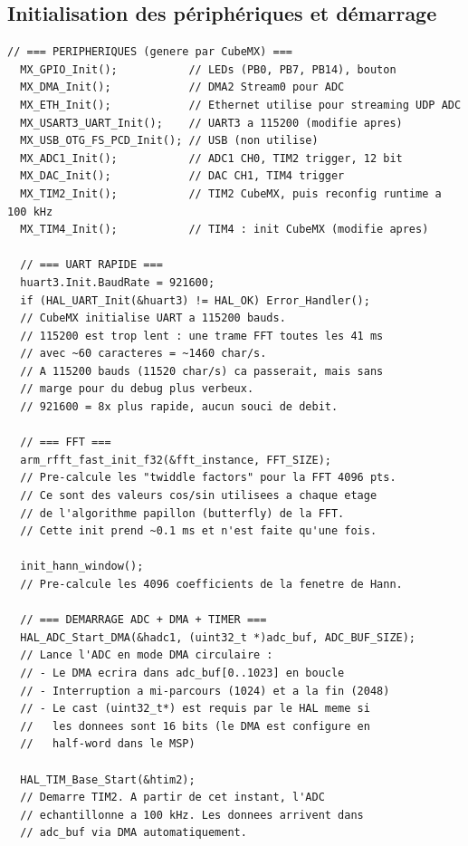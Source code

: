 \documentclass[a4paper,11pt]{article}
\begin{document}
\subsection{Initialisation des p\'eriph\'eriques et d\'emarrage}

\begin{lstlisting}[style=cstyle,caption={Init des p\'eriph\'eriques et d\'emarrage de l'acquisition}]
  // === PERIPHERIQUES (genere par CubeMX) ===
  MX_GPIO_Init();           // LEDs (PB0, PB7, PB14), bouton
  MX_DMA_Init();            // DMA2 Stream0 pour ADC
  MX_ETH_Init();            // Ethernet utilise pour streaming UDP ADC
  MX_USART3_UART_Init();    // UART3 a 115200 (modifie apres)
  MX_USB_OTG_FS_PCD_Init(); // USB (non utilise)
  MX_ADC1_Init();           // ADC1 CH0, TIM2 trigger, 12 bit
  MX_DAC_Init();            // DAC CH1, TIM4 trigger
  MX_TIM2_Init();           // TIM2 CubeMX, puis reconfig runtime a 100 kHz
  MX_TIM4_Init();           // TIM4 : init CubeMX (modifie apres)

  // === UART RAPIDE ===
  huart3.Init.BaudRate = 921600;
  if (HAL_UART_Init(&huart3) != HAL_OK) Error_Handler();
  // CubeMX initialise UART a 115200 bauds.
  // 115200 est trop lent : une trame FFT toutes les 41 ms
  // avec ~60 caracteres = ~1460 char/s.
  // A 115200 bauds (11520 char/s) ca passerait, mais sans
  // marge pour du debug plus verbeux.
  // 921600 = 8x plus rapide, aucun souci de debit.

  // === FFT ===
  arm_rfft_fast_init_f32(&fft_instance, FFT_SIZE);
  // Pre-calcule les "twiddle factors" pour la FFT 4096 pts.
  // Ce sont des valeurs cos/sin utilisees a chaque etage
  // de l'algorithme papillon (butterfly) de la FFT.
  // Cette init prend ~0.1 ms et n'est faite qu'une fois.

  init_hann_window();
  // Pre-calcule les 4096 coefficients de la fenetre de Hann.

  // === DEMARRAGE ADC + DMA + TIMER ===
  HAL_ADC_Start_DMA(&hadc1, (uint32_t *)adc_buf, ADC_BUF_SIZE);
  // Lance l'ADC en mode DMA circulaire :
  // - Le DMA ecrira dans adc_buf[0..1023] en boucle
  // - Interruption a mi-parcours (1024) et a la fin (2048)
  // - Le cast (uint32_t*) est requis par le HAL meme si
  //   les donnees sont 16 bits (le DMA est configure en
  //   half-word dans le MSP)

  HAL_TIM_Base_Start(&htim2);
  // Demarre TIM2. A partir de cet instant, l'ADC
  // echantillonne a 100 kHz. Les donnees arrivent dans
  // adc_buf via DMA automatiquement.
\end{lstlisting}
\end{document}
